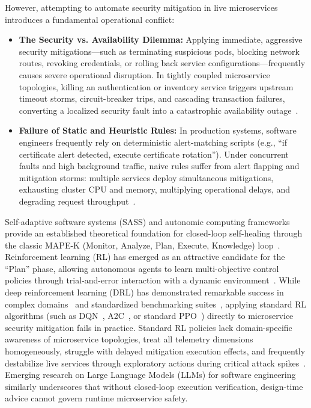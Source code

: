 \documentclass[11pt,a4paper]{article}
\begin{document}
However, attempting to automate security mitigation in live microservices introduces a fundamental operational conflict:
\begin{itemize}
    \item \textbf{The Security vs. Availability Dilemma:} Applying immediate, aggressive security mitigations—such as terminating suspicious pods, blocking network routes, revoking credentials, or rolling back service configurations—frequently causes severe operational disruption. In tightly coupled microservice topologies, killing an authentication or inventory service triggers upstream timeout storms, circuit-breaker trips, and cascading transaction failures, converting a localized security fault into a catastrophic availability outage~\cite{aderaldo2025declarative, schneider2015survey}.
    \item \textbf{Failure of Static and Heuristic Rules:} In production systems, software engineers frequently rely on deterministic alert-matching scripts (e.g., ``if certificate alert detected, execute certificate rotation''). Under concurrent faults and high background traffic, naive rules suffer from alert flapping and mitigation storms: multiple services deploy simultaneous mitigations, exhausting cluster CPU and memory, multiplying operational delays, and degrading request throughput~\cite{schneider2015survey}.
\end{itemize}

Self-adaptive software systems (SASS) and autonomic computing frameworks provide an established theoretical foundation for closed-loop self-healing through the classic MAPE-K (Monitor, Analyze, Plan, Execute, Knowledge) loop~\cite{salehie2009self, garlan2004rainbow, schneider2015survey}. Reinforcement learning (RL) has emerged as an attractive candidate for the ``Plan'' phase, allowing autonomous agents to learn multi-objective control policies through trial-and-error interaction with a dynamic environment~\cite{sutton1998reinforcement, mnih2015human}. While deep reinforcement learning (DRL) has demonstrated remarkable success in complex domains~\cite{silver2016mastering, mnih2016asynchronous} and standardized benchmarking suites~\cite{towers2026gymnasium, raffin2021stable}, applying standard RL algorithms (such as DQN~\cite{mnih2015human}, A2C~\cite{mnih2016asynchronous}, or standard PPO~\cite{schulman2017ppo}) directly to microservice security mitigation fails in practice. Standard RL policies lack domain-specific awareness of microservice topologies, treat all telemetry dimensions homogeneously, struggle with delayed mitigation execution effects, and frequently destabilize live services through exploratory actions during critical attack spikes~\cite{zheng2025proximal, standen2021cyborg, nguyen2021deep, xiao2018iot}. Emerging research on Large Language Models (LLMs) for software engineering~\cite{hou2024large} similarly underscores that without closed-loop execution verification, design-time advice cannot govern runtime microservice safety.
\end{document}
